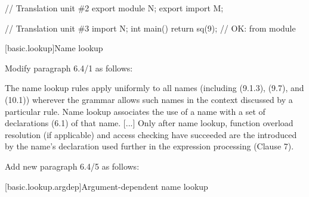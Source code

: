 \begin{std.txt}
\begin{codeblock}
    // Translation unit \#2
    export module N;
    export import M;

    // Translation unit \#3
    import N;
    int main() { return sq(9); }       // OK:  from module 
    \end{codeblock}
    \added{
    \exitexample
   \exitnote}
\end{std.txt}


\setcounter{section}{3}
[basic.lookup]{Name lookup}

Modify paragraph 6.4/1 as follows:
\begin{std.txt}
  \resetalinea[0]
  \alinea
  The name lookup rules apply uniformly to all names
  (including  (9.1.3),
   (9.7), and 
   (10.1))
  wherever the grammar allows such names in the context discussed by a 
  particular rule.
  Name lookup associates the use of a name with a set of declarations (6.1)
  of that name.
  [...] Only after name lookup, function overload resolution (if applicable)
  and access checking have succeeded are the
   introduced by
  the name's declaration
  used further in the expression processing (Clause 7).
\end{std.txt}

\begin{before}
Add new paragraph 6.4/5 as follows:
\begin{std.txt}\color{addclr}
  \resetalinea[4]
  \alinea
\end{std.txt}
\end{before}

\setcounter{subsection}{1}
[basic.lookup.argdep]{Argument-dependent name lookup}

